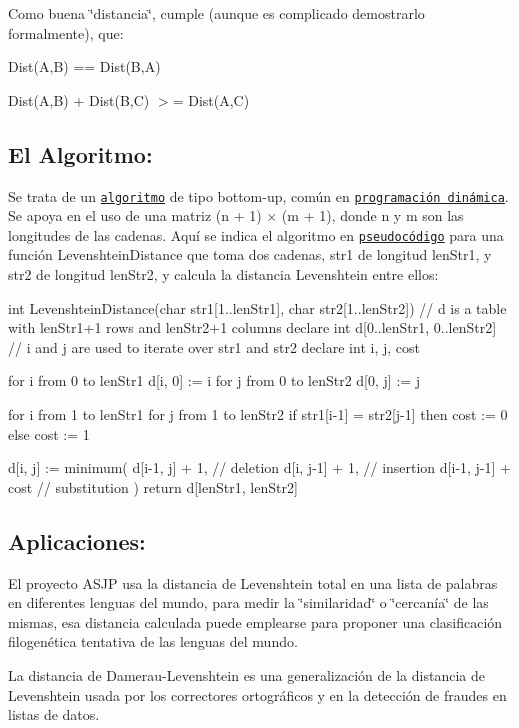 Como buena \char`\"{}distancia\char`\"{}, cumple (aunque es complicado demostrarlo formalmente), que\+:


\begin{DoxyItemize}
\item Dist(\+A,\+B) == Dist(\+B,\+A)
\item Dist(\+A,\+B) + Dist(\+B,\+C) $>$= Dist(\+A,\+C)
\end{DoxyItemize}

\subsection*{El Algoritmo\+:}

Se trata de un \href{https://es.wikipedia.org/wiki/Algoritmo}{\tt algoritmo} de tipo bottom-\/up, común en \href{https://es.wikipedia.org/wiki/Programaci%C3%B3n_din%C3%A1mica}{\tt programación dinámica}. Se apoya en el uso de una matriz (n + 1) × (m + 1), donde n y m son las longitudes de las cadenas. Aquí se indica el algoritmo en \href{https://es.wikipedia.org/wiki/Pseudoc%C3%B3digo}{\tt pseudocódigo} para una función Levenshtein\+Distance que toma dos cadenas, str1 de longitud len\+Str1, y str2 de longitud len\+Str2, y calcula la distancia Levenshtein entre ellos\+: \begin{DoxyVerb}int LevenshteinDistance(char str1[1..lenStr1], char str2[1..lenStr2])
    // d is a table with lenStr1+1 rows and lenStr2+1 columns
    declare int d[0..lenStr1, 0..lenStr2]
    // i and j are used to iterate over str1 and str2
    declare int i, j, cost

    for i from 0 to lenStr1
        d[i, 0] := i
    for j from 0 to lenStr2
        d[0, j] := j

    for i from 1 to lenStr1
        for j from 1 to lenStr2
            if str1[i-1] = str2[j-1]
                then cost := 0
            else
                cost := 1

            d[i, j] := minimum( d[i-1, j] + 1,      // deletion
                                d[i, j-1] + 1,      // insertion
                                d[i-1, j-1] + cost  // substitution
                                )
    return d[lenStr1, lenStr2]
\end{DoxyVerb}


\subsection*{Aplicaciones\+:}


\begin{DoxyItemize}
\item El proyecto A\+S\+JP usa la distancia de Levenshtein total en una lista de palabras en diferentes lenguas del mundo, para medir la \char`\"{}similaridad\char`\"{} o \char`\"{}cercanía\char`\"{} de las mismas, esa distancia calculada puede emplearse para proponer una clasificación filogenética tentativa de las lenguas del mundo.
\item La distancia de Damerau-\/\+Levenshtein es una generalización de la distancia de Levenshtein usada por los correctores ortográficos y en la detección de fraudes en listas de datos. 
\end{DoxyItemize}